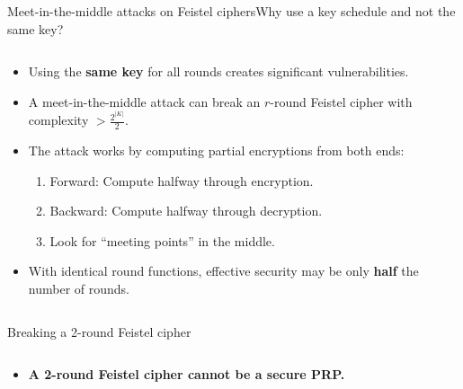 \documentclass[aspectratio=169, lualatex, handout]{beamer}
\begin{document}
\begin{frame}{Meet-in-the-middle attacks on Feistel ciphers}{Why use a key schedule and not the same key?}
	\begin{columns}[c]
		\begin{column}{0.65\textwidth}
			\begin{itemize}[<+->]
				\item Using the \textbf{same key} for all rounds creates significant vulnerabilities.
				\item A meet-in-the-middle attack can break an $r$-round Feistel cipher with complexity $> \frac{2^{|K|}}{2}$.
				\item The attack works by computing partial encryptions from both ends:
				      \begin{enumerate}[<+->]
					      \item Forward: Compute halfway through encryption.
					      \item Backward: Compute halfway through decryption.
					      \item Look for ``meeting points'' in the middle.
				      \end{enumerate}
				\item With identical round functions, effective security may be only \textbf{half} the number of rounds.
			\end{itemize}
		\end{column}
		\begin{column}{0.35\textwidth}
			\begin{center}
			\end{center}
		\end{column}
	\end{columns}
\end{frame}

\begin{frame}{Breaking a 2-round Feistel cipher}
	\begin{columns}[c]
		\begin{column}{0.5\textwidth}
			\begin{itemize}[<+->]
				\item \textbf{A 2-round Feistel cipher cannot be a secure PRP.}
			\end{itemize}
		\end{column}
		\begin{column}{0.5\textwidth}
			\begin{center}
			\end{center}
		\end{column}
	\end{columns}
\end{frame}
\end{document}
